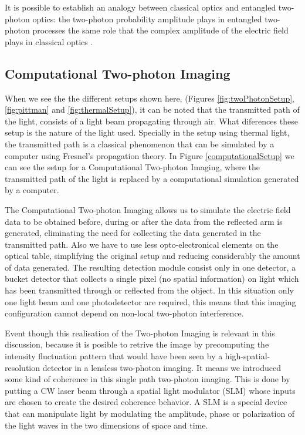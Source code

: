 It is possible to establish an analogy
between classical optics and entangled two-photon optics:
the two-photon probability amplitude plays in entangled
two-photon processes the same role that the complex amplitude
of the electric field plays in classical optics  \cite{thermalAlejandra}.

\subsection{Computational Two-photon Imaging}

When we see the the different setups shown here, (Figures \ref{fig:twoPhotonSetup}, \ref{fig:pittman} and \ref{fig:thermalSetup}),
it can be noted that the transmitted path of the light, consists of a light beam propagating through air. What diferences these setup is the nature of the light used.
Specially in the setup using thermal light, the transmitted path is a classical phenomenon that can be simulated by a computer using Fresnel's propagation theory.
In Figure \ref{computationalSetup} we can see the setup for a Computational
Two-photon Imaging, where the transmitted path of the light is replaced by a computational simulation generated by a computer.

The Computational Two-photon Imaging allows us to simulate the electric field data to be obtained before, during or after the data from the reflected arm is generated,
eliminating the need for collecting the data generated in the transmitted path. Also we have to use less opto-electronical elements on the optical table, simplifying 
the original setup and reducing considerably the amount of data generated. The resulting detection module consist only in one detector, a bucket detector that collects
 a single pixel (no spatial information) on light which has been transmitted through or reflected from the object.
In this situation only one light beam and one photodetector are required, this means that this imaging configuration cannot depend
on non-local two-photon interference.

Event though this realisation of the Two-photon Imaging is relevant in this discussion, 
because it is posible to retrive the image by precomputing the intensity fluctuation pattern that 
would have been seen by a high-spatial-resolution detector in a lensless two-photon imaging. 
It means we introduced some kind of coherence in this single path two-photon imaging. This is done by putting a CW
laser beam through a spatial light modulator (SLM) whose inputs are chosen to create the desired coherence behavior\cite{computational}.
A SLM is a special device that can manipulate light by modulating the amplitude, phase or polarization of the light waves in the two dimensions of space and time.



